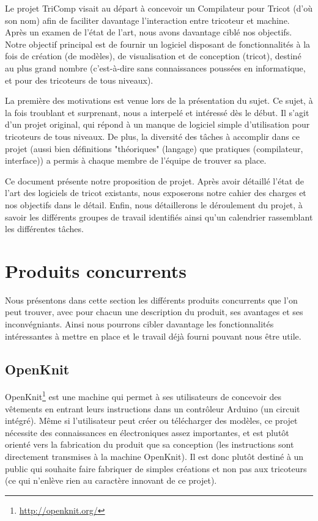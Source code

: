 \documentclass{article}
\begin{document}
Le projet TriComp visait au départ à concevoir un Compilateur pour Tricot (d'où son nom) afin de faciliter davantage l'interaction entre
tricoteur et machine. Après un examen de l'état de l'art, nous avons davantage ciblé nos objectifs. Notre objectif principal est de
fournir un logiciel disposant de fonctionnalités à la fois de création (de modèles), de visualisation et de conception (tricot),
destiné au plus grand nombre (c'est-à-dire sans connaissances poussées en informatique, et pour des tricoteurs de tous niveaux).

La première des motivations est venue lors de la présentation du sujet. Ce sujet, à la fois troublant et surprenant, nous a interpelé et 
intéressé dès le début. Il s'agit d'un projet original, qui répond à un manque de logiciel simple d'utilisation pour tricoteurs de tous
niveaux. De plus, la diversité des tâches à accomplir dans ce projet (aussi bien définitions "théoriques" (langage) que pratiques 
(compilateur, interface)) a permis à chaque membre de l'équipe de trouver sa place.

Ce document présente notre proposition de projet. Après avoir détaillé l'état de l'art des logiciels de tricot existants, nous exposerons
notre cahier des charges et nos objectifs dans le détail. Enfin, nous détaillerons le déroulement du projet, à savoir les différents
groupes de travail identifiés ainsi qu'un calendrier rassemblant les différentes tâches.

\section{Produits concurrents}

Nous présentons dans cette section les différents produits concurrents que l'on peut trouver, avec pour chacun une description du produit, 
ses avantages et ses inconvégniants. Ainsi nous pourrons cibler davantage les fonctionnalités intéressantes à mettre en place et le 
travail déjà fourni pouvant nous être utile.

\subsection{OpenKnit}

OpenKnit\footnote{\url{http://openknit.org/}} est une machine qui permet à ses utilisateurs de concevoir des vêtements en entrant leurs 
instructions dans un contrôleur Arduino (un circuit intégré). Même si l'utilisateur peut créer ou télécharger des modèles, ce projet 
nécessite des connaissances en électroniques assez importantes, et est plutôt orienté vers la fabrication du produit que sa conception 
(les instructions sont directement transmises à la machine OpenKnit). Il est donc plutôt destiné à un public qui souhaite faire fabriquer 
de simples créations et non pas aux tricoteurs (ce qui n'enlève rien au caractère innovant de ce projet).
\end{document}
